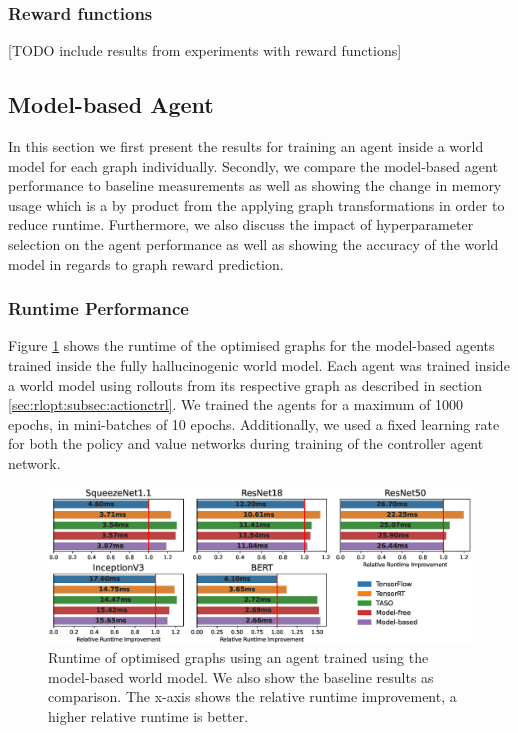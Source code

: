 \subsubsection{Reward functions}
\label{sec:eval:subsec:mf:subsubsec:rwd-func}

[TODO include results from experiments with reward functions]

\subsection{Model-based Agent}
\label{sec:eval:subsec:mbagent}

In this section we first present the results for training an agent inside a world model for each graph individually. Secondly, we compare the model-based agent performance to baseline measurements as well as showing the change in memory usage which is a by product from the applying graph transformations in order to reduce runtime. Furthermore, we also discuss the impact of hyperparameter selection on the agent performance as well as showing the accuracy of the world model in regards to graph reward prediction.

\subsubsection{Runtime Performance}

Figure \ref{fig:eval:world-model-runtimes} shows the runtime of the optimised graphs for the model-based agents trained inside the fully hallucinogenic world model. Each agent was trained inside a world model using rollouts from its respective graph as described in section \ref{sec:rlopt:subsec:actionctrl}. We trained the agents for a maximum of 1000 epochs, in mini-batches of 10 epochs. Additionally, we used a fixed learning rate for both the policy and value networks during training of the controller agent network.

\begin{figure}[h]
  \centering
  \includegraphics[width=1\columnwidth]{sections/5evaluation/images/runtimes_all_h}
  \caption[Runtimes of optimised graphs using a model-based controller]{Runtime of optimised graphs using an agent trained using the model-based world model. We also show the baseline results as comparison. The x-axis shows the relative runtime improvement, a higher relative runtime is better.}
  \label{fig:eval:world-model-runtimes}
\end{figure}

